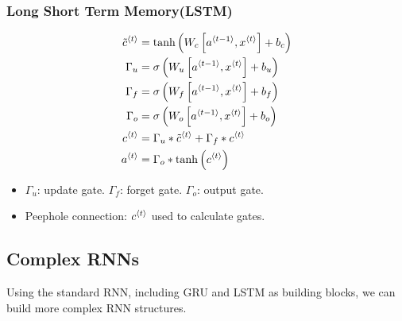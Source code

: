 \subsubsection{Long Short Term Memory(LSTM)}
\begin{align*}
  \tilde{c}^{\left\langle t\right\rangle}&=\tanh\left(W_c\left[a^{\left\langle t-1\right\rangle},x^{\left\langle t\right\rangle}\right]+b_c\right)\\
  \Gamma_u&=\sigma\left(W_u\left[a^{\left\langle t-1\right\rangle},x^{\left\langle t\right\rangle}\right]+b_u\right)\\
  \Gamma_f&=\sigma\left(W_f\left[a^{\left\langle t-1\right\rangle},x^{\left\langle t\right\rangle}\right]+b_f\right)\\
  \Gamma_o&=\sigma\left(W_o\left[a^{\left\langle t-1\right\rangle},x^{\left\langle t\right\rangle}\right]+b_o\right)\\
  c^{\left\langle t\right\rangle}&=\Gamma_u\ast \tilde{c}^{\left\langle t\right\rangle}+\Gamma_f \ast c^{\left\langle t\right\rangle}\\
  a^{\left\langle t\right\rangle}&=\Gamma_o\ast \tanh\left(c^{\left\langle t\right\rangle}\right)
\end{align*}
\begin{itemize}
  \item $\Gamma_u$: update gate. $\Gamma_f$: forget gate. $\Gamma_o$: output gate.
  \item Peephole connection: $c^{\left\langle t\right\rangle}$ used to calculate gates.
\end{itemize}
\subsection{Complex RNNs}
Using the standard RNN, including GRU and LSTM as building blocks, we can build more complex RNN structures.

